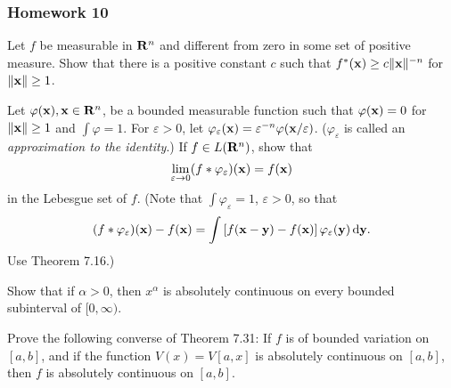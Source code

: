 \subsubsection{Homework 10}
\setcounter{exercise}{0}
\setcounter{equation}{0}

\begin{problem}
  Let $f$ be measurable in $\mathbf{R}^n$ and different from zero in some set of
  positive measure. Show that there is a positive constant $c$ such that
  $f^*(\mathbf{x})\geq c\|\mathbf{x}\|^{-n}$ for $\|\mathbf{x}\|\geq 1$.
\end{problem}
\begin{solution}
\end{solution}

\begin{problem}
  Let $\varphi(\mathbf{x}),\mathbf{x}\in\mathbf{R}^n$, be a bounded measurable function such
  that $\varphi(\mathbf{x})=0$ for $\|\mathbf{x}\|\geq 1$ and $\int\varphi=1$. For
  $\varepsilon>0$, let
  $\varphi_\varepsilon(\mathbf{x})=\varepsilon^{-n}\varphi(\mathbf{x}/\varepsilon)$.
  ($\varphi_\varepsilon$ is called an \emph{approximation to the
    identity}.) If $f\in L(\mathbf{R}^n)$, show that
  \[
    \lim_{\varepsilon\to 0}(f*\varphi_\varepsilon)(\mathbf{x})=f(\mathbf{x})
  \]
  in the Lebesgue set of $f$. (Note that $\int\varphi_\varepsilon=1$,
  $\varepsilon>0$, so that
  \[
    (f*\varphi_\varepsilon)(\mathbf{x})-f(\mathbf{x})=\int\left[f(\mathbf{x}-\mathbf{y})-f(\mathbf{x})\right]\varphi_\varepsilon(\mathbf{y})\mathop{}\!\mathrm{d}\mathbf{y}.
  \]
  Use Theorem 7.16.)
\end{problem}
\begin{solution}
\end{solution}

\begin{problem}
  Show that if $\alpha>0$, then $x^\alpha$ is absolutely continuous on
  every bounded subinterval of $[0,\infty)$.
\end{problem}
\begin{solution}
\end{solution}

\begin{problem}
  Prove the following converse of Theorem 7.31: If $f$ is of bounded
  variation on $[a,b]$, and if the function $V(x)=V[a,x]$ is absolutely
  continuous on $[a,b]$, then $f$ is absolutely continuous on $[a,b]$.
\end{problem}
\begin{solution}
\end{solution}

